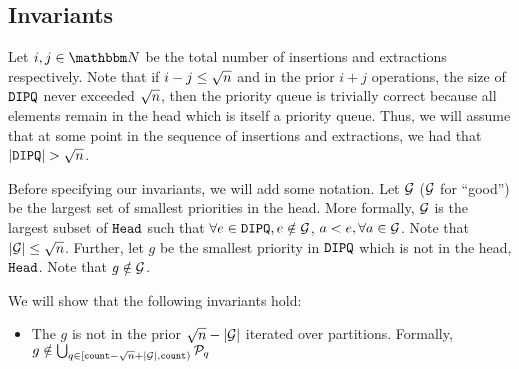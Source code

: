 \subsection{Invariants}
\label{subsec:invariants}
Let $i, j \in \N$ be the total number of insertions and extractions respectively. Note that if $i - j \leq {\sqrt{n}}$
and in the prior $i + j$ operations, the size of $\texttt{DIPQ}$ never exceeded ${\sqrt{n}}$, then the priority queue is trivially correct because all elements remain in the head which is itself a priority queue.
Thus, we will assume that at some point in the sequence of insertions and extractions, we had that $|\texttt{DIPQ}| > {\sqrt{n}}$.

Before specifying our invariants, we will add some notation. Let $\mathcal{G}$ ($\mathcal{G}$ for ``good'') be the largest set of smallest priorities in the head. More formally,
$\mathcal{G}$ is the largest subset of $\texttt{Head}$ such that $\forall e \in \texttt{DIPQ}, e \notin \mathcal{G}$, $a < e, \forall a \in \mathcal{G}$. Note that $|\mathcal{G}| \leq {\sqrt{n}}$.
Further, let $g$ be the smallest priority in $\texttt{DIPQ}$ which is not in the head, $\texttt{Head}$.
Note that $g \notin \mathcal{G}$.

We will show that the following invariants hold:
\begin{itemize}
	\item The $g$ is not in the prior ${\sqrt{n}} - |\mathcal{G}|$ iterated over partitions. Formally, $g \notin \bigcup_{q \in [{\texttt{count}} - {\sqrt{n}} + |\mathcal{G}|, {\texttt{count}})} \mathcal{P}_q$
\end{itemize}

